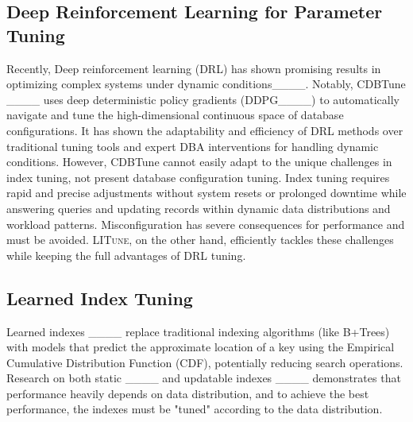 \subsection{Deep Reinforcement Learning for Parameter Tuning}
\label{sec:TD}
Recently, Deep reinforcement learning (DRL) has shown promising results in optimizing complex systems under dynamic conditions____. Notably, CDBTune ____ uses deep deterministic policy gradients (DDPG____) to automatically navigate and tune the high-dimensional continuous space of database configurations. It has shown the adaptability and efficiency of DRL methods over traditional tuning tools and expert DBA interventions for handling dynamic conditions. However, CDBTune cannot easily adapt to the unique challenges in index tuning, not present database configuration tuning. Index tuning requires rapid and precise adjustments without system resets or prolonged downtime while answering queries and updating records within dynamic data distributions and workload patterns. Misconfiguration has severe consequences for performance and must be avoided. \textsc{LITune}, on the other hand, efficiently tackles these challenges while keeping the full advantages of DRL tuning.




\subsection{Learned Index Tuning}


Learned indexes ____ replace traditional indexing algorithms (like B+Trees) with models that predict the approximate location of a key using the Empirical Cumulative Distribution Function (CDF), potentially reducing search operations. Research on both static ____ and updatable indexes ____ demonstrates that performance heavily depends on data distribution, and to achieve the best performance, the indexes must be "tuned" according to the data distribution.


